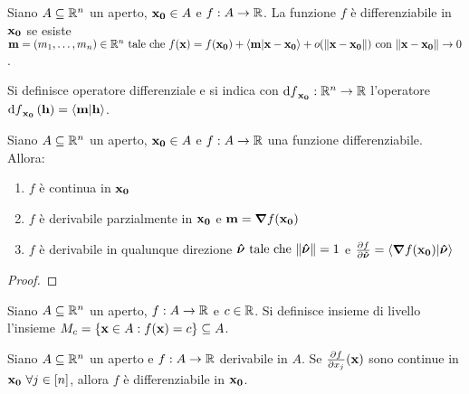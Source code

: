 \begin{definition}
    Siano $A \subseteq \mathbb{R}^n$ un aperto, $\vb{x_0} \in A$ e $f:A \to \mathbb{R}$. La funzione $f$ è differenziabile in $\vb{x_0}$ se esiste $\vb{m} = (m_1,\dots,m_n) \in \R^n \tc f(\vb{x}) = f(\vb{x_0}) + \innerproduct{\vb{m}}{\vb{x} - \vb{x_0}} + o(\norm{\vb{x} - \vb{x_0}}) \with \norm{\vb{x}-\vb{x_0}}\to 0$.
\end{definition}

\begin{definition}
    Si definisce operatore differenziale e si indica con $\dd{f}_{\vb{x_0}} : \mathbb{R}^n \to \mathbb{R}$ l'operatore $\dd{f}_{\vb{x_0}}(\vb{h})=\innerproduct{\vb{m}}{\vb{h}}$.
\end{definition}

\begin{theorem}
    Siano $A \subseteq \mathbb{R}^n$ un aperto, $\vb{x_0} \in A$ e $f:A \to \mathbb{R}$ una funzione differenziabile. Allora:
    \begin{enumerate}
        \item $f$ è continua in $\vb{x_0}$
        \item $f$ è derivabile parzialmente in $\vb{x_0}$ e $\vb{m} = \bm{\nabla}f(\vb{x_0})$
        \item $f$ è derivabile in qualunque direzione $\bm{\hat{\nu}} \text{ tale che } \norm{\bm{\hat{\nu}}}=1$ e $\frac{\partial f}{\partial \bm{\hat{\nu}}} = \innerproduct{\grad f(\vb{x_0})}{\bm{\hat{\nu}}}$
    \end{enumerate}
\end{theorem}

\begin{proof}
\end{proof}

\begin{definition}
    Siano $A \subseteq \mathbb{R}^n$ un aperto, $f:A \to \mathbb{R}$ e $c \in \mathbb{R}$. Si definisce insieme di livello l'insieme $M_c = \{ \vb{x} \in A : f(\vb{x})=c\}\subseteq A$.
\end{definition}

\begin{theorem}
    Siano $A \subseteq \mathbb{R}^n$ un aperto e $f: A \to \mathbb{R}$ derivabile in $A$. Se $\frac{\partial f}{\partial x_j} (\vb{x})$ sono continue in $\vb{x_0} \ \forall j \in [n]$, allora $f$ è differenziabile in $\vb{x_0}$.
\end{theorem}

